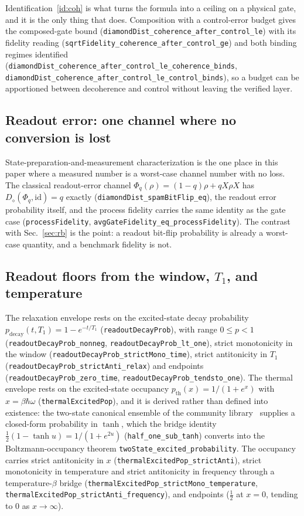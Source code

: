 \documentclass[aps,pra,reprint,nofootinbib,superscriptaddress]{revtex4-2}
\theoremstyle{plain}
\theoremstyle{definition}
\theoremstyle{remark}
\newcommand{\lean}[1]{\texttt{#1}}
\newcommand{\ddist}{D_{\diamond}}
\begin{document}
Identification~\ref{id:coh} is what turns the formula into a ceiling on a
physical gate, and it is the only thing that does. Composition with a
control-error budget gives the composed-gate bound
(\lean{diamondDist\_coherence\_after\_control\_le}) with its fidelity
reading (\lean{sqrtFidelity\_coherence\_after\_control\_ge}) and both
binding regimes identified
(\lean{diamondDist\_coherence\_after\_control\_le\_coherence\_binds},
\lean{diamondDist\_coherence\_after\_control\_le\_control\_binds}), so a
budget can be apportioned between decoherence and control without leaving
the verified layer.

\subsection{Readout error: one channel where no conversion is lost}

State-preparation-and-measurement characterization is the one place in
this paper where a measured number is a worst-case channel number with no
loss. The classical readout-error channel
$\Phi_q(\rho)=(1-q)\rho + qX\rho X$ has
$\ddist(\Phi_q,\mathrm{id}) = q$ exactly
(\lean{diamondDist\_spamBitFlip\_eq}), the readout error probability
itself, and the process fidelity carries the same identity as the gate
case (\lean{processFidelity},
\lean{avgGateFidelity\_eq\_processFidelity}). The contrast with
Sec.~\ref{sec:rb} is the point: a readout bit-flip probability is already
a worst-case quantity, and a benchmark fidelity is not.

\subsection{Readout floors from the window, $T_1$, and temperature}
\label{sec:readout}

The relaxation envelope rests on the excited-state decay probability
$p_{\mathrm{decay}}(t,T_1) = 1 - e^{-t/T_1}$ (\lean{readoutDecayProb}),
with range $0 \le p < 1$ (\lean{readoutDecayProb\_nonneg},
\lean{readoutDecayProb\_lt\_one}), strict monotonicity in the window
(\lean{readoutDecayProb\_strictMono\_time}), strict antitonicity in $T_1$
(\lean{readoutDecayProb\_strictAnti\_relax}) and endpoints
(\lean{readoutDecayProb\_zero\_time},
\lean{readoutDecayProb\_tendsto\_one}). The thermal envelope rests on the
excited-state occupancy $p_{\mathrm{th}}(x) = 1/(1+e^{x})$ with
$x = \beta\hbar\omega$ (\lean{thermalExcitedPop}), and it is derived
rather than defined into existence: the two-state canonical ensemble of
the community library~\cite{Meiburg2025PhysLib} supplies a closed-form
probability in $\tanh$, which the bridge identity
$\tfrac12(1-\tanh u) = 1/(1+e^{2u})$ (\lean{half\_one\_sub\_tanh})
converts into the Boltzmann-occupancy theorem
\lean{twoState\_excited\_probability}. The occupancy carries strict
antitonicity in $x$ (\lean{thermalExcitedPop\_strictAnti}), strict
monotonicity in temperature and strict antitonicity in frequency through
a temperature-$\beta$ bridge
(\lean{thermalExcitedPop\_strictMono\_temperature},
\lean{thermalExcitedPop\_strictAnti\_frequency}), and endpoints
($\tfrac12$ at $x=0$, tending to $0$ as $x\to\infty$).
\end{document}

